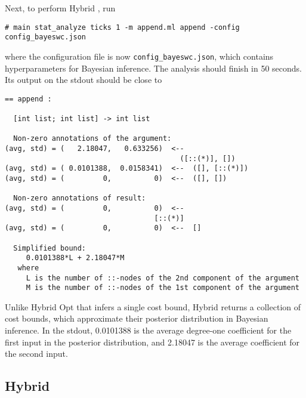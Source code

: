 Next, to perform Hybrid \BayesWC{}, run
\begin{verbatim}
# main stat_analyze ticks 1 -m append.ml append -config config_bayeswc.json
\end{verbatim}
where the configuration file is now \texttt{config\_bayeswc.json}, which
contains hyperparameters for Bayesian inference.
%
The analysis should finish in 50 seconds.
%
Its output on the stdout should be close to
\begin{verbatim}
== append :

  [int list; int list] -> int list

  Non-zero annotations of the argument:
(avg, std) = (   2.18047,   0.633256)  <--
                                         ([::(*)], [])
(avg, std) = ( 0.0101388,  0.0158341)  <--  ([], [::(*)])
(avg, std) = (         0,          0)  <--  ([], [])

  Non-zero annotations of result:
(avg, std) = (         0,          0)  <--
                                   [::(*)]
(avg, std) = (         0,          0)  <--  []

  Simplified bound:
     0.0101388*L + 2.18047*M
   where
     L is the number of ::-nodes of the 2nd component of the argument
     M is the number of ::-nodes of the 1st component of the argument
\end{verbatim}
%
Unlike Hybrid Opt{} that infers a single cost bound, Hybrid \BayesWC{} returns a
collection of cost bounds, which approximate their posterior distribution in
Bayesian inference.
%
In the stdout, 0.0101388 is the average degree-one coefficient for the first
input in the posterior distribution, and 2.18047 is the average
coefficient for the second input.

\subsection{Hybrid \BayesPC{}}

